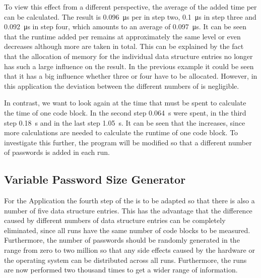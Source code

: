 To view this effect from a different perspective, the average of the added time per \MEASUREPAIR can be calculated. The result is \SI{0.096}{\micro\second} per \MEASUREPAIR in step two, \SI{0.1}{\micro\second} in step three and \SI{0.092}{\micro\second} in step four, which amounts to an average of \SI{0.097}{\micro\second}. It can be seen that the runtime added per \MEASUREPAIR remains at approximately the same level or even decreases although more \MEASUREVALUES are taken in total. This can be explained by the fact that the allocation of memory for the individual data structure entries no longer has such a large influence on the result. In the previous example it could be seen that it has a big influence whether three or four \MEASUREPAIRS have to be allocated. However, in this application the deviation between the different numbers of \MEASUREPAIRS is negligible. 

In contrast, we want to look again at the time that must be spent to calculate the time of one code block. In the second step \SI{0.064}{\second} were spent, in the third step \SI{0.18}{\second} and in the last step \SI{1.05}{\second}. It can be seen that the \TOTALCODEBLOCK increases, since more calculations are needed to calculate the runtime of one code block. To investigate this further, the \PASSWORDGEN program will be modified so that a different number of passwords is added in each run. 

\subsection{Variable Password Size Generator}
For the \VARPASSWORDGEN Application the fourth step of the \PASSWORDGEN is to be adapted so that there is also a number of five data structure entries. This has the advantage that the difference caused by different numbers of data structure entries can be completely eliminated, since all runs have the same number of code blocks to be measured. Furthermore, the number of passwords should be randomly generated in the range from zero to two million so that any side effects caused by the hardware or the operating system can be distributed across all runs. Furthermore, the runs are now performed two thousand times to get a wider range of information. 

